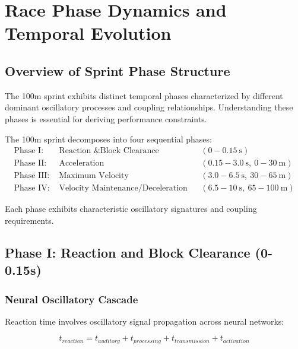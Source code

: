 \section{Race Phase Dynamics and Temporal Evolution}

\subsection{Overview of Sprint Phase Structure}

The 100m sprint exhibits distinct temporal phases characterized by different dominant oscillatory processes and coupling relationships. Understanding these phases is essential for deriving performance constraints.

\begin{definition}
The 100m sprint decomposes into four sequential phases:
\begin{align}
\text{Phase I: } &\text{Reaction \& Block Clearance} && (0-0.15~\text{s}) \label{eq:phase1}\\
\text{Phase II: } &\text{Acceleration} && (0.15-3.0~\text{s},~0-30~\text{m}) \label{eq:phase2}\\
\text{Phase III: } &\text{Maximum Velocity} && (3.0-6.5~\text{s},~30-65~\text{m}) \label{eq:phase3}\\
\text{Phase IV: } &\text{Velocity Maintenance/Deceleration} && (6.5-10~\text{s},~65-100~\text{m}) \label{eq:phase4}
\end{align}
\end{definition}

Each phase exhibits characteristic oscillatory signatures and coupling requirements.

\subsection{Phase I: Reaction and Block Clearance (0-0.15s)}

\subsubsection{Neural Oscillatory Cascade}

Reaction time involves oscillatory signal propagation across neural networks:

\begin{equation}
t_{reaction} = t_{auditory} + t_{processing} + t_{transmission} + t_{activation}
\label{eq:reaction_components}
\end{equation}

